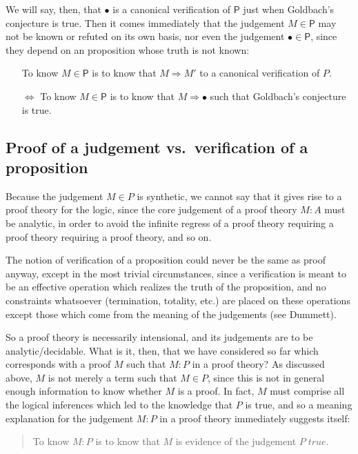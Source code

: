 \documentclass{amsart}
\theoremstyle{definition}
\theoremstyle{remark}
\numberwithin{equation}{section}
\newcommand\istrue[1]{\ensuremath{#1\;\mathit{true}}}
\newcommand\ver[2]{\ensuremath{#1\in#2}}
\newcommand\reduce[2]{\ensuremath{#1\Rightarrow#2}}
\begin{document}
We will say, then, that $\bullet$ is a canonical verification of $\mathsf{P}$
just when Goldbach's conjecture is true. Then it comes immediately that the
judgement \ver{M}{\mathsf{P}} may not be known or refuted on its own basis, nor
even the judgement \ver{\bullet}{\mathsf{P}}, since they depend on an
proposition whose truth is not known:

\begin{itemize}
  \item[] To know \ver{M}{\mathsf{P}} is to know that \reduce{M}{M'} to a
    canonical verification of $P$.
  \item[$\Leftrightarrow$] To know $\ver{M}{\mathsf{P}}$ is to know that
    \reduce{M}{\bullet} such that Goldbach's conjecture is true.
\end{itemize}

\subsection{Proof of a judgement vs.\ verification of a proposition}

Because the judgement \ver{M}{P} is synthetic, we cannot say that it gives rise
to a proof theory for the logic, since the core judgement of a proof theory
$M:A$ must be analytic, in order to avoid the infinite regress of a proof
theory requiring a proof theory requiring a proof theory, and so on.

The notion of verification of a proposition could never be the same as proof
anyway, except in the most trivial circumstances, since a verification is meant
to be an effective operation which realizes the truth of the proposition, and
no constraints whatsoever (termination, totality, etc.) are placed on these
operations except those which come from the meaning of the judgements (see
Dummett).

So a proof theory is necessarily intensional, and its judgements are to be
analytic/decidable. What is it, then, that we have considered so far which
corresponds with a proof $M$ such that $M:P$ in a proof theory? As discussed
above, $M$ is not merely a term such that \ver{M}{P}, since this is not in
general enough information to know whether $M$ is a proof. In fact, $M$ must
comprise all the logical inferences which led to the knowledge that $P$ is
true, and so a meaning explanation for the judgement $M:P$ in a proof theory
immediately suggests itself:
\begin{quote}
  To know $M:P$ is to know that $M$ is evidence of the judgement \istrue{P}.
\end{quote}
\end{document}

